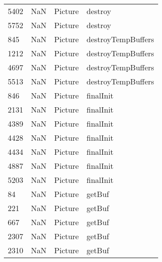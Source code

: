\begin{tabular}{llll}
5402 &                   NaN &                    Picture &                                   destroy \\
5752 &                   NaN &                    Picture &                                   destroy \\
845  &                   NaN &                    Picture &                        destroyTempBuffers \\
1212 &                   NaN &                    Picture &                        destroyTempBuffers \\
4697 &                   NaN &                    Picture &                        destroyTempBuffers \\
5513 &                   NaN &                    Picture &                        destroyTempBuffers \\
846  &                   NaN &                    Picture &                                 finalInit \\
2131 &                   NaN &                    Picture &                                 finalInit \\
4389 &                   NaN &                    Picture &                                 finalInit \\
4428 &                   NaN &                    Picture &                                 finalInit \\
4434 &                   NaN &                    Picture &                                 finalInit \\
4887 &                   NaN &                    Picture &                                 finalInit \\
5203 &                   NaN &                    Picture &                                 finalInit \\
84   &                   NaN &                    Picture &                                    getBuf \\
221  &                   NaN &                    Picture &                                    getBuf \\
667  &                   NaN &                    Picture &                                    getBuf \\
2307 &                   NaN &                    Picture &                                    getBuf \\
2310 &                   NaN &                    Picture &                                    getBuf \\

\end{tabular}
